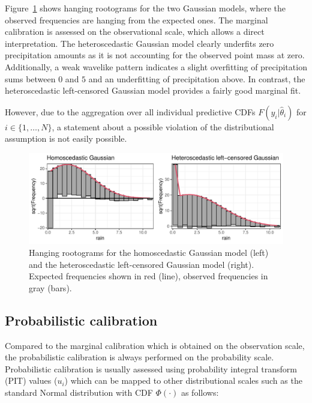 \documentclass[twoside]{report}
\begin{document}
Figure~\ref{stauffer:fig1} shows hanging rootograms for the two Gaussian
models, where the observed frequencies are hanging from the expected ones. The
marginal calibration is assessed on the observational scale, which allows a
direct interpretation.  The heteroscedastic Gaussian model clearly underfits
zero precipitation amounts as it is not accounting for the observed point mass
at zero. Additionally, a weak wavelike pattern indicates a slight overfitting
of precipitation sums between $0$ and $5$ and an underfitting of precipitation
above. In contrast, the heteroscedastic left-censored Gaussian model provides a
fairly good marginal fit.

However, due to the aggregation over all individual predictive CDFs
$F(y_i|\hat{\theta}_i)$ for $i \in \{1, \dots, N\}$, a statement about a
possible violation of the distributional assumption is not easily possible.

\begin{figure}[!ht]\centering
    \includegraphics[width=\textwidth]{Stauffer-rootograms}
    \caption{\label{stauffer:fig1}
        Hanging rootograms for the homoscedastic Gaussian model (left)
        and the heteroscedastic left-censored Gaussian model (right).
        Expected frequencies shown in red (line), observed frequencies
        in gray (bars).
    }
\end{figure}

\subsection{Probabilistic calibration}

Compared to the marginal calibration which is obtained on the observation
scale, the probabilistic calibration is always performed on the probability
scale. Probabilistic calibration is usually assessed using probability
integral transform (PIT) values ($u_i$) which can be mapped to other
distributional scales such as the standard Normal distribution
with CDF $\Phi(\cdot)$ as follows:
\end{document}
